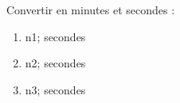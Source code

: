 \documentclass[exercice]{thedocument}%
\begin{document}
%
Convertir en minutes et secondes :
\begin{enumerate}
    \item \<n1; secondes
    \item \<n2; secondes
    \item \<n3; secondes
\end{enumerate}
\end{document}
